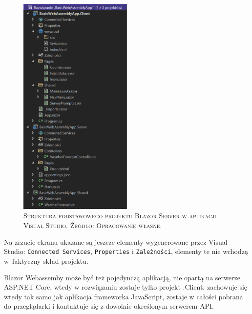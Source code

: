 \documentclass[12pt,a4paper,oneside]{book}
\newcommand{\captionT}[1]{\caption{\textsc{\footnotesize{#1}}}}
\begin{document}
\begin{figure}[H]
\centering
\includegraphics[width=0.5\textwidth]{images/BasicBlazorWebassemblyApp.pdf}
\captionT{Struktura podstawowego projektu Blazor Server w aplikacji Visual Studio. Źródło: Opracowanie własne.}
\label{rys_basic_app_blazor_wasm}
\end{figure}

Na zrzucie ekranu ukazane są jeszcze elementy wygenerowane przez Visual Studio: \texttt{Connected Services}, \texttt{Properties} i \texttt{Zależności}, elementy te nie wchodzą w~faktyczny skład projektu.

Blazor Webassemby może być też pojedynczą aplikacją, nie opartą na serwerze ASP.NET Core, wtedy w rozwiązaniu zostaje tylko projekt .Client, zachowuje się wtedy tak samo jak aplikacja frameworka JavaScript, zostaje w całości pobrana do przeglądarki i kontaktuje się z dowolnie określonym serwerem API.

\end{document}
